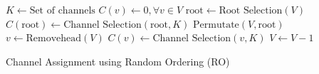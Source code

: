 \documentclass{article}
\begin{document}
\begin{algorithm}
  $K \gets \text{Set of channels}$\;
  $C(v) \gets 0,\forall v \in V$\;
  $\text{root} \gets \text{Root Selection}(V)$\;
  $C(\text{root}) \gets \text{Channel Selection}(\text{root},K)$\;
  $\text{Permutate}(V,\text{root})$\;
  {
    $v \gets \text{Removehead}(V)$\;
    $C(v) \gets \text{Channel Selection}(v,K)$\;
    $V \gets V-1$\;
  }
  \;
  \caption{Channel Assignment using Random Ordering (RO)}
\end{algorithm}
\end{document}
